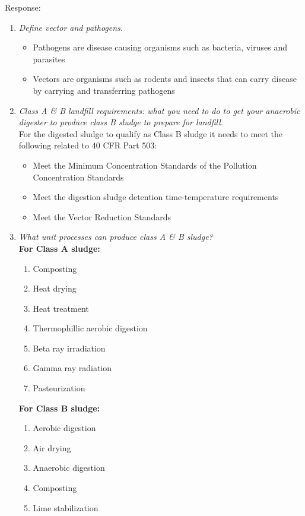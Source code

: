\begin{enumerate}
Response:\\
\begin{enumerate}[label=\alph*]
\item \textit{Define vector and pathogens.}
\begin{itemize}
\item Pathogens are disease causing organisms such as bacteria, viruses and parasites 
\item Vectors are organisms such as rodents and insects that can carry disease by carrying and transferring pathogens
\end{itemize}
\item \textit{Class A \& B landfill requirements: what you need to do to get your anaerobic digester to produce class B sludge to prepare for landfill.}\\
For the digested sludge to qualify as Class B sludge it needs to meet the following related to 40 CFR Part 503:
\begin{itemize}
\item Meet the Minimum Concentration Standards of the Pollution Concentration Standards
\item Meet the digestion sludge detention time-temperature requirements
\item Meet the Vector Reduction Standards
\end{itemize}
\item \textit{What unit processes can produce class A \& B sludge?}\\
\textbf{For Class A sludge:}
\begin{enumerate}
\item Composting
\item Heat drying
\item Heat treatment
\item Thermophillic aerobic digestion
\item Beta ray irradiation
\item Gamma ray radiation
\item Pasteurization
\end{enumerate}
\pagebreak
\textbf{For Class B sludge:}
\begin{enumerate}
\item Aerobic digestion
\item Air drying
\item Anaerobic digestion
\item Composting
\item Lime stabilization
\end{enumerate}
\end{enumerate}


\end{enumerate}